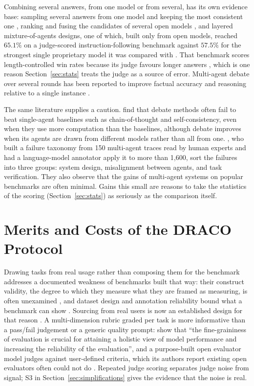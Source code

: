 \documentclass[11pt]{article}
\newcommand{\sectionbreak}{\par\ifdim\pagetotal<5.5\baselineskip\relax\else\clearpage\fi}
\begin{document}
Combining several answers, from one model or from several, has its own evidence base: sampling several answers from one model and keeping the most consistent one \citep{wang2023selfconsistency}, ranking and fusing the candidates of several open models \citep{jiang2023llmblender}, and layered mixture-of-agents designs, one of which, built only from open models, reached $65.1\%$ on a judge-scored instruction-following benchmark against $57.5\%$ for the strongest single proprietary model it was compared with \citep{wang2024moa}. That benchmark scores length-controlled win rates because its judge favours longer answers \citep{dubois2024lengthcontrolled}, which is one reason Section~\ref{sec:stats} treats the judge as a source of error. Multi-agent debate over several rounds has been reported to improve factual accuracy and reasoning relative to a single instance \citep{du2023multiagent, liang2024encouraging}.

The same literature supplies a caution. \citet{zhang2025stopovervaluing} find that debate methods often fail to beat single-agent baselines such as chain-of-thought and self-consistency, even when they use more computation than the baselines, although debate improves when its agents are drawn from different models rather than all from one. \citet{cemri2025mast}, who built a failure taxonomy from 150 multi-agent traces read by human experts and had a language-model annotator apply it to more than 1,600, sort the failures into three groups: system design, misalignment between agents, and task verification. They also observe that the gains of multi-agent systems on popular benchmarks are often minimal. Gains this small are reasons to take the statistics of the scoring (Section~\ref{sec:stats}) as seriously as the comparison itself.

\sectionbreak
\section{Merits and Costs of the DRACO Protocol}
\label{sec:strengths}

Drawing tasks from real usage rather than composing them for the benchmark addresses a documented weakness of benchmarks built that way: their construct validity, the degree to which they measure what they are framed as measuring, is often unexamined \citep{raji2021everything}, and dataset design and annotation reliability bound what a benchmark can show \citep{bowman2021fix}. Sourcing from real users is now an established design for that reason \citep{chiang2024arena, lin2024wildbench}. A multi-dimension rubric graded per task is more informative than a pass/fail judgement or a generic quality prompt:
\citet{ye2024flask} show that ``the fine-graininess of evaluation is crucial for attaining
a holistic view of model performance and increasing the reliability of the evaluation'',
and a purpose-built open evaluator model judges against user-defined criteria, which its authors report existing open evaluators often could not do \citep{kim2024prometheus2}. Repeated judge scoring separates judge noise from signal; S3 in Section~\ref{sec:simplifications} gives the evidence that the noise is real.
\end{document}
